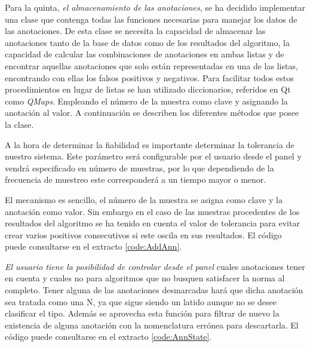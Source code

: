         
    Para la quinta, \textit{el almacenamiento de las anotaciones}, se ha decidido implementar una clase que contenga todas las funciones necesarias para manejar los datos de las anotaciones. De esta clase se necesita la capacidad de almacenar las anotaciones tanto de la base de datos como de los resultados del algoritmo, la capacidad de calcular las combinaciones de anotaciones en ambas listas y de encontrar aquellas anotaciones que solo están representadas en una de las listas, encontrando con ellas los falsos positivos y negativos. Para facilitar todos estos procedimientos en lugar de listas se han utilizado diccionarios, referidos en Qt como \textit{QMaps}. Empleando el número de la muestra como clave y asignando la anotación al valor. A continuación se describen los diferentes métodos que posee la clase.
        
    A la hora de determinar la fiabilidad es importante determinar la tolerancia de nuestro sistema. Este parámetro será configurable por el usuario desde el panel y vendrá especificado en número de muestras, por lo que dependiendo de la frecuencia de muestreo este corresponderá a un tiempo mayor o menor.

    El mecanismo es sencillo, el número de la muestra se asigna como clave y la anotación como valor. Sin embargo en el caso de las muestras procedentes de los resultados del algoritmo se ha tenido en cuenta el valor de tolerancia para evitar crear varios positivos consecutivos si este oscila en sus resultados. El código puede consultarse en el extracto \ref{code:AddAnn}.
        

    \textit{El usuario tiene la posibilidad de controlar desde el panel} cuales anotaciones tener en cuenta y cuales no para algoritmos que no busquen satisfacer la norma al completo. Tener alguna de las anotaciones desmarcadas hará que dicha anotación sea tratada como una N, ya que sigue siendo un latido aunque no se desee clasificar el tipo. Además se aprovecha esta función para filtrar de nuevo la existencia de alguna anotación con la nomenclatura errónea para descartarla. El código puede consultarse en el extracto \ref{code:AnnState}.
        
        
